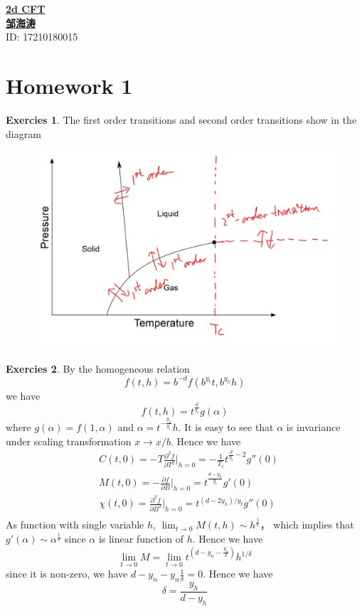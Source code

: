 \documentclass[11pt,a4paper]{article}
\theoremstyle{definition}
\newtheorem{exer}{Exercies}[subsection]
\begin{document}
\noindent
{\LARGE\underline{\textbf{2d CFT}}}\\
{\hfill\large  \underline{\textbf{邹海涛}} \\
	\hfill ID: 17210180015}\\
\section{Homework 1}
\begin{exer}
	The first order transitions and second order transitions show in the diagram
	\begin{figure}[h]
		\centering\includegraphics[scale=0.5]{PIC/hw1.png}
	\end{figure}
\end{exer}
\begin{exer}
	By the homogeneous relation
\[
f(t,h)= b^{-d}f(b^{y_t} t, b^{y_h} h)
\]
we have 
\[
f(t,h)= t^{\frac{d}{y_t}}g(\alpha)
\]
where $g(\alpha) = f(1,\alpha)$ and $\alpha = t^{-\frac{y_h}{y_t}}h$. It is easy to see that $\alpha$ is invariance under scaling transformation $x \to x/b$.
Hence we have 
\[
\begin{aligned}
&C(t,0) = -T \frac{\partial ^2 f}{\partial T ^2}\big|_{h=0} = - \frac{1}{T_c} t^{\frac{d}{y_t}-2}g''(0) \\
& M(t,0) = -\frac{\partial f}{\partial B}\big|_{h=0} =t^{\frac{d-y_h}{y_t}}g'(0)\\
& \chi(t,0) = \frac{\partial^2 f}{\partial B^2}\big|_{h=0} = t^{(d-2y_h)/y_t} g''(0)\\
\end{aligned}
\]
As function with single variable $h$, $\lim_{t \to 0}  M(t,h) \sim h^{\frac{1}{\delta}}$， which implies that $g'(\alpha) \sim \alpha^{\frac{1}{\delta}}$ since $\alpha$ is linear function of $h$. Hence we have 
\[
\lim_{t \to 0} M = \lim_{t \to 0} t^{(d-y_n - \frac{y_n}{\delta})}h ^{1/\delta}
\]
since it is non-zero, we have $d- y_n - y_n \frac{1}{\delta}=0$. Hence we have 
\[
\delta = \frac{y_h}{d-y_h}
\]	
\end{exer}
\end{document}
